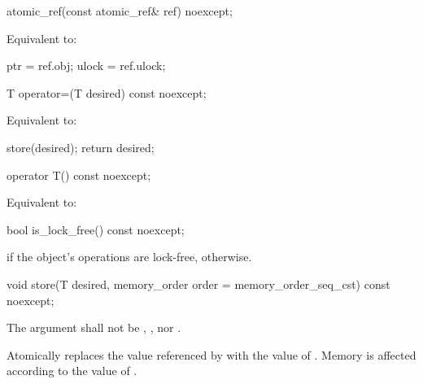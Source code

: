 \begin{itemdecl}
atomic_ref(const atomic_ref& ref) noexcept;
\end{itemdecl}

\begin{itemdescr}
\pnum
\effects {}
\begin{addedblock}Equivalent to:
\begin{codeblock}
  ptr = ref.obj;
  ulock = ref.ulock;
\end{codeblock}
\end{addedblock}

\end{itemdescr}

\begin{itemdecl}
T operator=(T desired) const noexcept;
\end{itemdecl}

\begin{itemdescr}
\pnum
\effects Equivalent to:
\begin{codeblock}
  store(desired);
  return desired;
\end{codeblock}
\end{itemdescr}

\begin{itemdecl}
operator T() const noexcept;
\end{itemdecl}

\begin{itemdescr}
\pnum
\effects Equivalent to: 
\end{itemdescr}

\begin{itemdecl}
bool is_lock_free() const noexcept;
\end{itemdecl}

\begin{itemdescr}
\pnum
\returns {} if the object's operations are lock-free,
 otherwise.
\end{itemdescr}

\begin{itemdecl}
void store(T desired, memory_order order = memory_order_seq_cst) const noexcept;
\end{itemdecl}

\begin{itemdescr}
\pnum
\removed{\requires}\added{\expects} The  argument shall not be
,
, nor
.

\pnum
\effects Atomically replaces the value referenced by 
with the value of .
Memory is affected according to the value of .
\end{itemdescr}


